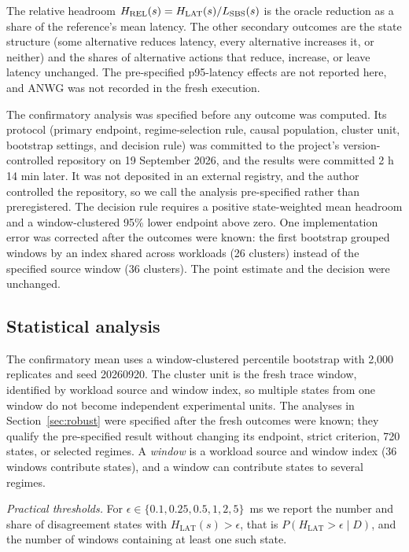 \documentclass[preprint,12pt]{elsarticle}
\begin{document}
The relative headroom $H_{\mathrm{REL}}(s)=H_{\mathrm{LAT}}(s)/L_{\mathrm{SBS}}(s)$ is
the oracle reduction as a share of the reference's mean latency. The other
secondary outcomes are the state structure (some alternative reduces latency,
every alternative increases it, or neither) and the shares of alternative
actions that reduce, increase, or leave latency unchanged. The pre-specified
p95-latency effects are not reported here, and ANWG was not recorded in the
fresh execution.

The confirmatory analysis was specified before any outcome was computed. Its
protocol (primary endpoint, regime-selection rule, causal population, cluster
unit, bootstrap settings, and decision rule) was committed to the project's
version-controlled repository on 19 September 2026, and the results were
committed 2 h 14 min later. It was not deposited in an external registry, and
the author controlled the repository, so we call the analysis pre-specified
rather than preregistered. The decision rule requires a positive state-weighted
mean headroom and a window-clustered 95\% lower endpoint above zero. One
implementation error was corrected after the outcomes were known: the first
bootstrap grouped windows by an index shared across workloads (26 clusters)
instead of the specified source window (36 clusters). The point estimate and the
decision were unchanged.

\subsection{Statistical analysis}
\label{sec:posthoc}
The confirmatory mean uses a window-clustered percentile bootstrap with 2,000
replicates and seed 20260920. The cluster unit is the fresh trace window,
identified by workload source and window index, so multiple states from one
window do not become independent experimental units. The analyses in
Section~\ref{sec:robust} were specified after the fresh outcomes were known;
they qualify the pre-specified result without changing its endpoint, strict
criterion, 720 states, or selected regimes. A \emph{window} is a workload source
and window index (36 windows contribute states), and a window can contribute
states to several regimes.

\emph{Practical thresholds.} For $\epsilon\in\{0.1,0.25,0.5,1,2,5\}$~ms we
report the number and share of disagreement states with
$H_{\mathrm{LAT}}(s)>\epsilon$, that is \mbox{$P(H_{\mathrm{LAT}}>\epsilon\mid D)$},
and the number of windows containing at least one such state.
\end{document}
